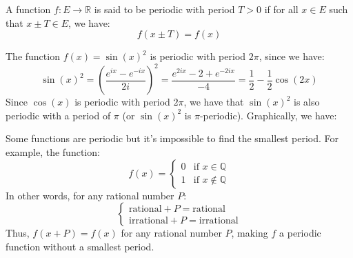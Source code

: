 \begin{definition}
    A function $f : E \to \mathbb{R}$ is said to be periodic with period $T > 0$ if for all $x \in E$ such that $x \pm T \in E$, we have:
    \[
        f(x \pm T) = f(x)
    \]
\end{definition}
\begin{eg}
    The function $f(x) = \sin(x)^2$ is periodic with period $2\pi$, since we have:
    \[
        \sin(x)^2 = \left(\frac{e^{ix} - e^{-ix}}{2i}\right)^2 = \frac{e^{2ix} - 2 + e^{-2ix}}{-4} = \frac{1}{2} - \frac{1}{2}\cos(2x)
    \]
    Since $\cos(x)$ is periodic with period $2\pi$, we have that $\sin(x)^2$ is also periodic with a period of $\pi$ (or $\sin(x)^2$ is $\pi$-periodic).
    Graphically, we have:
    \begin{center}
    \end{center}
\end{eg}
\begin{eg}
    Some functions are periodic but it's impossible to find the smallest period. For example, the function:
    \[
        f(x) = \begin{cases}
            0 & \text{if } x \in \mathbb{Q} \\
            1 & \text{if } x \notin \mathbb{Q}
        \end{cases}
    \]
    In other words, for any rational number $P$:
    \[
        \begin{cases}
            \text{rational} + P = \text{rational} \\
            \text{irrational} + P = \text{irrational}
        \end{cases}
    \]
    Thus, $f(x + P) = f(x)$ for any rational number $P$, making $f$ a periodic function without a smallest period.
\end{eg}

